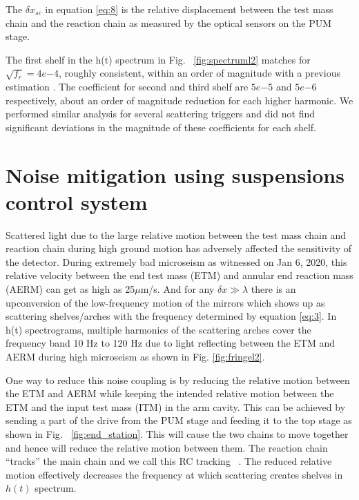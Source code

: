\documentclass[12pt]{iopart}
\begin{document}
The $\delta x_{sc} $ in equation \ref{eq:8} is the relative displacement between the test mass chain and the reaction chain as measured by the optical sensors on the PUM stage. 

The first shelf in the h(t) spectrum in Fig. ~\ref{fig:spectruml2} matches for $\sqrt{f_{r}} = 4e{-4}$, roughly consistent, within an order of magnitude with a previous estimation \cite{hiro_calc}. The coefficient for second and third shelf are $5e{-5}$ and $5e{-6}$ respectively, about an order of magnitude reduction for each higher harmonic. We performed similar analysis for several scattering triggers and did not find significant deviations in the magnitude of these coefficients for each shelf.
\qquad



\section{Noise mitigation using suspensions control system} \label{rzero}

Scattered light due to the large relative motion between the test mass chain and reaction chain during high ground motion has adversely affected the sensitivity of the detector. 
During extremely bad microseism as witnessed on Jan 6, 2020, this relative velocity between the end test mass (ETM) and annular end reaction mass (AERM) can get as high as 25${\mu}$m/s. And for any ${\delta}x \gg {\lambda}$ there is an upconversion of the low-frequency motion of the mirrors which shows up as scattering shelves/arches with the frequency determined by equation \ref{eq:3}. In h(t) spectrograms, multiple harmonics of the scattering arches cover the frequency band 10 Hz to 120 Hz due to light reflecting between the ETM and AERM during high microseism as shown in Fig. \ref{fig:fringel2}.

One way to reduce this noise coupling is by reducing the relative motion between the ETM and AERM while keeping the intended relative motion between the ETM and the input test mass (ITM) in the arm cavity. This can be achieved by sending a part of the drive from the PUM stage and feeding it to the top stage as shown in Fig. ~\ref{fig:end_station}. This will cause the two chains to move together and hence will reduce the relative motion between them. The reaction chain ``tracks'' the main chain and we call this RC tracking ~\cite{alog_robert}.
The reduced relative motion effectively decreases the frequency at which scattering creates shelves in $h(t)$ spectrum. 
\end{document}
